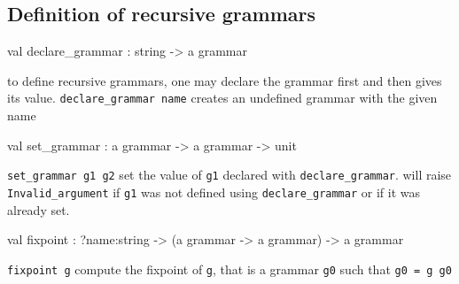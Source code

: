 \documentclass[11pt]{article}
\begin{document}
\subsection{Definition of recursive grammars }




\label{val:Grammar.declare-underscoregrammar}\begin{ocamldoccode}
val declare_grammar : string -> {\textquotesingle}a grammar
\end{ocamldoccode}
\begin{ocamldocdescription}
to define recursive grammars, one may declare the grammar first and then
    gives its value.
    {\tt{declare\_grammar name}} creates an undefined grammar with the given name


\end{ocamldocdescription}




\label{val:Grammar.set-underscoregrammar}\begin{ocamldoccode}
val set_grammar : {\textquotesingle}a grammar -> {\textquotesingle}a grammar -> unit
\end{ocamldoccode}
\begin{ocamldocdescription}
{\tt{set\_grammar g1 g2}} set the value of {\tt{g1}} declared with {\tt{declare\_grammar}}.
    will raise {\tt{Invalid\_argument}} if {\tt{g1}} was not defined using
    {\tt{declare\_grammar}} or if it was already set.


\end{ocamldocdescription}




\label{val:Grammar.fixpoint}\begin{ocamldoccode}
val fixpoint : ?name:string ->
  ({\textquotesingle}a grammar -> {\textquotesingle}a grammar) -> {\textquotesingle}a grammar
\end{ocamldoccode}
\begin{ocamldocdescription}
{\tt{fixpoint g}} compute the fixpoint of {\tt{g}}, that is a grammar {\tt{g0}} such that
    {\tt{g0 = g g0}}


\end{ocamldocdescription}
\end{document}
